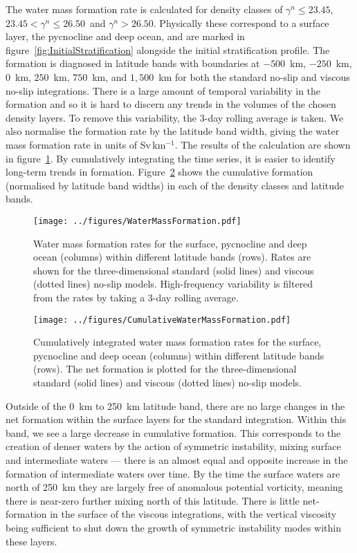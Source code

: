 The water mass formation rate is calculated for density classes of $\gamma^n \leq 23.45$, $23.45 < \gamma^n \leq 26.50$~and $\gamma^n > 26.50$. Physically these correspond to a surface layer, the pycnocline and deep ocean, and are marked in figure~\ref{fig:InitialStratification} alongside the initial stratification profile. The formation is diagnosed in latitude bands with boundaries at $-500$~km, $-250$~km, $0$~km, $250$~km, $750$~km, and $1,500$~km for both the standard no-slip and viscous no-slip integrations. There is a large amount of temporal variability in the formation and so it is hard to discern any trends in the volumes of the chosen density layers. To remove this variability, the 3-day rolling average is taken. We also normalise the formation rate by the latitude band width, giving the water mass formation rate in units of Sv\,km$^{-1}$. The results of the calculation are shown in figure~\ref{fig:WaterMassFormation}. By cumulatively integrating the time series, it is easier to identify long-term trends in formation. Figure~\ref{fig:CumulativeWaterMassFormation} shows the cumulative formation (normalised by latitude band widths) in each of the density classes and latitude bands.

\begin{figure} 
    \centering
    \texttt{[image: ../figures/WaterMassFormation.pdf]}
    \caption{Water mass formation rates for the surface, pycnocline and deep ocean (columns) within different latitude bands (rows). Rates are shown for the three-dimensional standard (solid lines) and viscous (dotted lines) no-slip models. High-frequency variability is filtered from the rates by taking a 3-day rolling average.}
    \label{fig:WaterMassFormation}
\end{figure}

\begin{figure} 
    \centering
    \texttt{[image: ../figures/CumulativeWaterMassFormation.pdf]}
    \caption{Cumulatively integrated water mass formation rates for the surface, pycnocline and deep ocean (columns) within different latitude bands (rows). The net formation is plotted for the three-dimensional standard (solid lines) and viscous (dotted lines) no-slip models.}
    \label{fig:CumulativeWaterMassFormation}
\end{figure}

Outside of the 0~km to 250~km latitude band, there are no large changes in the net formation within the surface layers for the standard integration. Within this band, we see a large decrease in cumulative formation. This corresponds to the creation of denser waters by the action of symmetric instability, mixing surface and intermediate waters --- there is an almost equal and opposite increase in the formation of intermediate waters over time. By the time the surface waters are north of 250~km they are largely free of anomalous potential vorticity, meaning there is near-zero further mixing north of this latitude. There is little net-formation in the surface of the viscous integrations, with the vertical viscosity being sufficient to shut down the growth of symmetric instability modes within these layers.

